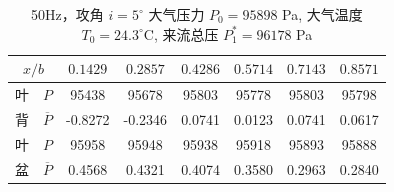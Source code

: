 \begin{table}[H]
  \centering
  \caption[50Hz 攻角 $i=5^\circ$ 实验数据]{50Hz，攻角 $i=5^\circ$ 大气压力 $P_0=95898$ Pa, 大气温度 $T_0=24.3^\circ\text{C}$, 来流总压 $P_1^*=96178$ Pa}
  \label{tab:exp4_50Hz_5}
  \renewcommand{\arraystretch}{1.2}
  \begin{tabular}{cccccccc}
    \toprule
    \multicolumn{2}{c}{$x/b$} & $0.1429$ & $0.2857$ & $0.4286$ & $0.5714$ & $0.7143$ & $0.8571$ \\
    \midrule
    叶 & $P$ & 95438 & 95678 & 95803 & 95778 & 95803 & 95798 \\
    背 & $\overline{P}$ & -0.8272 & -0.2346 & 0.0741 & 0.0123 & 0.0741 & 0.0617 \\
    \midrule
    叶 & $P$ & 95958 & 95948 & 95938 & 95918 & 95893 & 95888 \\
    盆 & $\overline{P}$ & 0.4568 & 0.4321 & 0.4074 & 0.3580 & 0.2963 & 0.2840 \\
    \bottomrule
  \end{tabular}
\end{table}